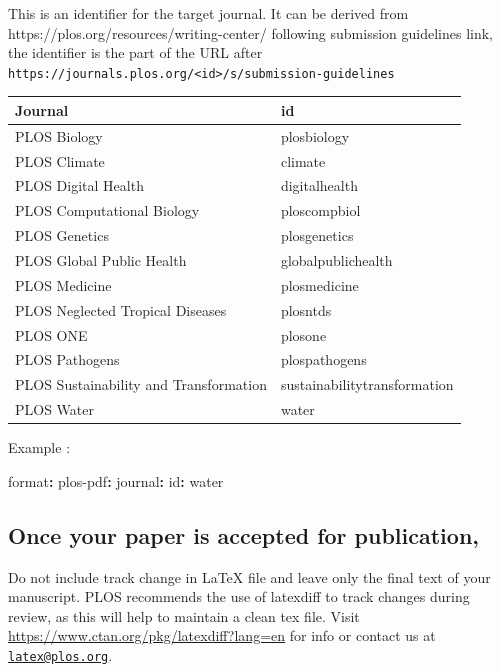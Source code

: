 \documentclass[
  10pt,
  letterpaper,
]{article}
\newenvironment{Shaded}{\begin{snugshade}}{\end{snugshade}}
\newcommand{\AttributeTok}[1]{\textcolor[rgb]{0.40,0.45,0.13}{#1}}
\newcommand{\FunctionTok}[1]{\textcolor[rgb]{0.28,0.35,0.67}{#1}}
\newcommand{\KeywordTok}[1]{\textcolor[rgb]{0.00,0.23,0.31}{\textbf{#1}}}
\newcounter{none} %
\begin{document}
This is an identifier for the target journal. It can be derived from
https://plos.org/resources/writing-center/ following submission
guidelines link, the identifier is the part of the URL after
\texttt{https://journals.plos.org/\textless{}id\textgreater{}/s/submission-guidelines}

{\def\LTcaptype{none} %
\begin{longtable}[]{@{}ll@{}}
\toprule\noalign{}
Journal & id \\
\midrule\noalign{}
\endhead
\bottomrule\noalign{}
\endlastfoot
PLOS Biology & plosbiology \\
PLOS Climate & climate \\
PLOS Digital Health & digitalhealth \\
PLOS Computational Biology & ploscompbiol \\
PLOS Genetics & plosgenetics \\
PLOS Global Public Health & globalpublichealth \\
PLOS Medicine & plosmedicine \\
PLOS Neglected Tropical Diseases & plosntds \\
PLOS ONE & plosone \\
PLOS Pathogens & plospathogens \\
PLOS Sustainability and Transformation & sustainabilitytransformation \\
PLOS Water & water \\
\end{longtable}
}

Example :

\begin{Shaded}
\begin{Highlighting}[]
\FunctionTok{format}\KeywordTok{:}
\AttributeTok{  }\FunctionTok{plos{-}pdf}\KeywordTok{:}
\AttributeTok{    }\FunctionTok{journal}\KeywordTok{:}
\AttributeTok{      }\FunctionTok{id}\KeywordTok{:}\AttributeTok{ water}
\end{Highlighting}
\end{Shaded}

\subsection{Once your paper is accepted for
publication,}\label{once-your-paper-is-accepted-for-publication}

Do not include track change in LaTeX file and leave only the final text
of your manuscript. PLOS recommends the use of latexdiff to track
changes during review, as this will help to maintain a clean tex file.
Visit \url{https://www.ctan.org/pkg/latexdiff?lang=en} for info or
contact us at \href{mailto:latex@plos.org}{\nolinkurl{latex@plos.org}}.
\end{document}
